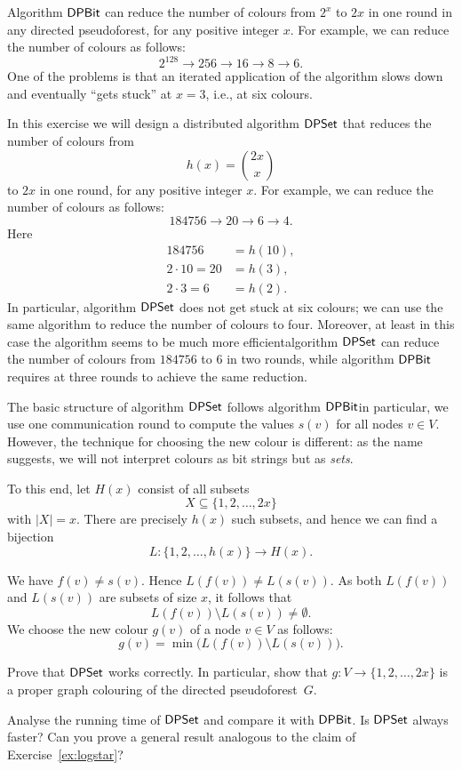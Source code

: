 \begin{ex}\label{ex:dpset}
    Algorithm $\textsf{DPBit}$ can reduce the number of colours from $2^x$ to $2x$ in one round in any directed pseudoforest, for any positive integer $x$. For example, we can reduce the number of colours as follows:
    \[
        2^{128} \to 256 \to 16 \to 8 \to 6.
    \]
    One of the problems is that an iterated application of the algorithm slows down and eventually ``gets stuck'' at $x = 3$, i.e., at six colours.
    
    In this exercise we will design a distributed algorithm $\textsf{DPSet}$ that reduces the number of colours from
    \[
        h(x) = \binom{2x}{x}
    \]
    to $2x$ in one round, for any positive integer $x$. For example, we can reduce the number of colours as follows:
    \[
        184756 \to 20 \to 6 \to 4.
    \]
    Here
    \begin{align*}
        184756 &= h(10), \\
        2 \cdot 10 = 20 &= h(3), \\
        2 \cdot 3 = 6 &= h(2).
    \end{align*}
    In particular, algorithm $\textsf{DPSet}$ does not get stuck at six colours; we can use the same algorithm to reduce the number of colours to four. Moreover, at least in this case the algorithm seems to be much more efficient\mydash algorithm $\textsf{DPSet}$ can reduce the number of colours from $184756$ to $6$ in two rounds, while algorithm $\textsf{DPBit}$ requires at three rounds to achieve the same reduction.
    
    The basic structure of algorithm $\textsf{DPSet}$ follows algorithm $\textsf{DPBit}$\mydash in particular, we use one communication round to compute the values $s(v)$ for all nodes $v \in V$. However, the technique for choosing the new colour is different: as the name suggests, we will not interpret colours as bit strings but as \emph{sets}.
    
    To this end, let $H(x)$ consist of all subsets
    \[
        X \subseteq \{1,2,\dotsc,2x\}
    \]
    with $|X| = x$. There are precisely $h(x)$ such subsets, and hence we can find a bijection
    \[
        L\colon \{1,2,\dotsc,h(x)\} \to H(x).
    \]
    
    We have $f(v) \ne s(v)$. Hence $L(f(v)) \ne L(s(v))$. As both $L(f(v))$ and $L(s(v))$ are subsets of size $x$, it follows that
    \[
        L(f(v)) \setminus L(s(v)) \ne \emptyset.
    \]
    We choose the new colour $g(v)$ of a node $v \in V$ as follows:
    \[
        g(v) = \min \bigl( L(f(v)) \setminus L(s(v)) \bigr).
    \]

    Prove that $\textsf{DPSet}$ works correctly. In particular, show that $g\colon V \to \{1,2,\dotsc,2x\}$ is a proper graph colouring of the directed pseudoforest~$G$.
    
    Analyse the running time of $\textsf{DPSet}$ and compare it with $\textsf{DPBit}$. Is $\textsf{DPSet}$ always faster? Can you prove a general result analogous to the claim of Exercise~\ref{ex:logstar}?
\end{ex}

